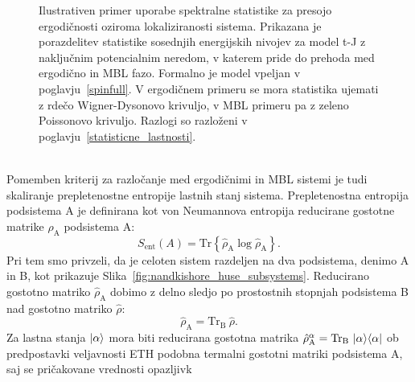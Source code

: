 \begin{figure}[H]
\caption{Ilustrativen primer uporabe spektralne statistike za presojo ergodičnosti oziroma lokaliziranosti sistema. Prikazana je porazdelitev statistike sosednjih energijskih nivojev za model t-J z naključnim potencialnim neredom, v katerem pride do prehoda med ergodično in MBL fazo. Formalno je model vpeljan v poglavju~\ref{spinfull}. V ergodičnem primeru se mora statistika ujemati z rdečo Wigner-Dysonovo krivuljo, v MBL primeru pa z zeleno Poissonovo krivuljo. Razlogi so razloženi v poglavju~\ref{statisticne_lastnosti}.
}
\label{fig:unfolding_demo}
\end{figure}
\noindent
\begin{minipage}[t]{0.65\textwidth}
\noindent \\
Pomemben kriterij za razločanje med ergodičnimi in MBL sistemi je tudi skaliranje prepletenostne entropije lastnih stanj sistema. Prepletenostna entropija podsistema A je definirana kot von Neumannova entropija reducirane gostotne matrike $\hat{\rho}_\mathrm{A}$ podsistema A: 
\begin{equation}\label{eq:entanglement}
S_\mathrm{ent}\left(A\right)=\mathrm{Tr}\left\{ \hat{\rho}_\mathrm{A}\log \hat{\rho}_\mathrm{A}\right\}.
\end{equation}
Pri tem smo privzeli, da je celoten sistem razdeljen na dva podsistema, denimo A in B, kot prikazuje Slika~\ref{fig:nandkishore_huse_subsystems}. Reducirano gostotno matriko $\hat{\rho}_\mathrm{A}$ dobimo z delno sledjo  po prostostnih stopnjah podsistema B nad gostotno matriko $\hat{\rho}$:
\begin{equation}
\hat{\rho}_\mathrm{A}=\mathrm{Tr}_\mathrm{B}\	 \hat{\rho}.
\end{equation}
Za lastna stanja $\vert\alpha\rangle$ mora biti reducirana gostotna matrika $\hat{\rho}_\mathrm{A}^\alpha=\mathrm{Tr}_\mathrm{B}\ \ket{\alpha}\bra{\alpha}$ ob predpostavki veljavnosti ETH podobna termalni gostotni matriki podsistema A, saj se pričakovane vrednosti opazljivk
\end{minipage}\hfill
